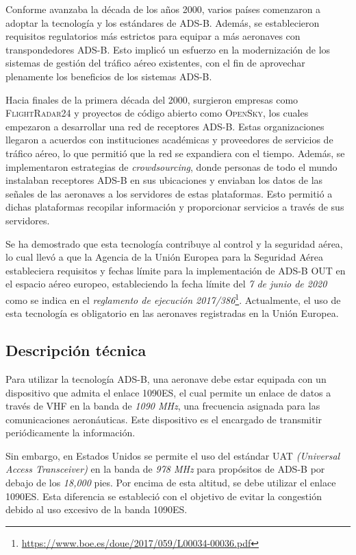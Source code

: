 \documentclass[a4paper, 11pt]{book}
\begin{document}
Conforme avanzaba la década de los años 2000, varios países comenzaron a adoptar la tecnología y los estándares de \textsc{ADS-B}. Además, se establecieron requisitos regulatorios más estrictos para equipar a más aeronaves con transpondedores \textsc{ADS-B}. Esto implicó un esfuerzo en la modernización de los sistemas de gestión del tráfico aéreo existentes, con el fin de aprovechar plenamente los beneficios de los sistemas \textsc{ADS-B}.

Hacia finales de la primera década del 2000, surgieron empresas como \textsc{FlightRadar24} y proyectos de código abierto como \textsc{OpenSky}, los cuales empezaron a desarrollar una red de receptores \textsc{ADS-B}. Estas organizaciones llegaron a acuerdos con instituciones académicas y proveedores de servicios de tráfico aéreo, lo que permitió que la red se expandiera con el tiempo. 
Además, se implementaron estrategias de \emph{\gls{crowdsourcing}}, donde personas de todo el mundo instalaban receptores \textsc{ADS-B} en sus ubicaciones y enviaban los datos de las señales de las aeronaves a los servidores de estas plataformas. Esto permitió a dichas plataformas recopilar información y proporcionar servicios a través de sus servidores.

Se ha demostrado que esta tecnología contribuye al control y la seguridad aérea, lo cual llevó a que la Agencia de la Unión Europea para la Seguridad Aérea estableciera requisitos y fechas límite para la implementación de \textsc{ADS-B OUT} en el espacio aéreo europeo, estableciendo la fecha límite del \emph{7 de junio de 2020} como se indica en el \emph{reglamento de ejecución 2017/386}\footnote{\url{https://www.boe.es/doue/2017/059/L00034-00036.pdf}}. Actualmente, el uso de esta tecnología es obligatorio en las aeronaves registradas en la Unión Europea.
\subsection{Descripción técnica}
Para utilizar la tecnología \textsc{ADS-B}, una aeronave debe estar equipada con un dispositivo que admita el enlace \textsc{\gls{1090ES}}, el cual permite un enlace de datos a través de \textsc{VHF} en la banda de \emph{1090 MHz}, una frecuencia asignada para las comunicaciones aeronáuticas. Este dispositivo es el encargado de transmitir periódicamente la información.

Sin embargo, en Estados Unidos se permite el uso del estándar \textsc{\gls{UAT}} \emph{(Universal Access Transceiver)} en la banda de \emph{978 MHz} para propósitos de \textsc{ADS-B} por debajo de los \emph{18,000} pies. Por encima de esta altitud, se debe utilizar el enlace \textsc{1090ES}. Esta diferencia se estableció con el objetivo de evitar la congestión debido al uso excesivo de la banda \textsc{1090ES}.
\end{document}
